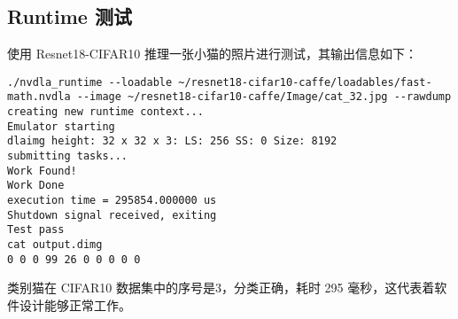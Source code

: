 \subsection{Runtime 测试}

使用 Resnet18-CIFAR10 推理一张小猫的照片进行测试，其输出信息如下：

\begin{lstlisting}
./nvdla_runtime --loadable ~/resnet18-cifar10-caffe/loadables/fast-math.nvdla --image ~/resnet18-cifar10-caffe/Image/cat_32.jpg --rawdump
creating new runtime context...
Emulator starting
dlaimg height: 32 x 32 x 3: LS: 256 SS: 0 Size: 8192
submitting tasks...
Work Found!
Work Done
execution time = 295854.000000 us
Shutdown signal received, exiting
Test pass
cat output.dimg 
0 0 0 99 26 0 0 0 0 0 
\end{lstlisting}

类别猫在 CIFAR10 数据集中的序号是3，分类正确，耗时 295 毫秒，这代表着软件设计能够正常工作。